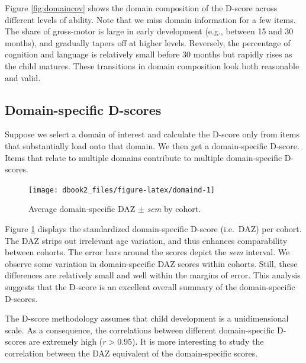 \documentclass[
]{book}
\begin{document}
Figure \ref{fig:domaincov} shows the domain composition of the D-score across different levels of ability. Note that we miss domain information for a few items. The share of gross-motor is large in early development (e.g., between 15 and 30 months), and gradually tapers off at higher levels. Reversely, the percentage of cognition and language is relatively small before 30 months but rapidly rises as the child matures. These transitions in domain composition look both reasonable and valid.

\hypertarget{domain-specific-d-scores}{%
\subsection{Domain-specific D-scores}\label{domain-specific-d-scores}}

Suppose we select a domain of interest and calculate the D-score only from items that substantially load onto that domain. We then get a domain-specific D-score. Items that relate to multiple domains contribute to multiple domain-specific D-scores.

\begin{figure}

{\centering \texttt{[image: dbook2\_files/figure-latex/domaind-1]} 

}

\caption{Average domain-specific DAZ \(\pm\) \emph{sem} by cohort.}\label{fig:domaind}
\end{figure}



Figure \ref{fig:domaind} displays the standardized domain-specific D-score (i.e.~DAZ) per cohort. The DAZ strips out irrelevant age variation, and thus enhances comparability between cohorts. The error bars around the scores depict the \emph{sem} interval. We observe some variation in domain-specific DAZ scores within cohorts. Still, these differences are relatively small and well within the margins of error. This analysis suggests that the D-score is an excellent overall summary of the domain-specific D-scores.

The D-score methodology assumes that child development is a unidimensional scale. As a consequence, the correlations between different domain-specific D-scores are extremely high (\(r > 0.95\)). It is more interesting to study the correlation between the DAZ equivalent of the domain-specific scores.
\end{document}
